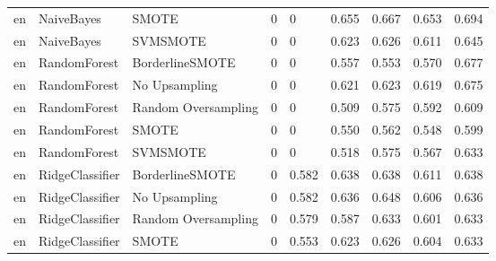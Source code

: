 \begin{tabular}{lllllllll}
      en &                   NaiveBayes &               SMOTE &         0 &                         0 &                 0.655 &                  0.667 &                                   0.653 &     0.694 \\
      en &                   NaiveBayes &            SVMSMOTE &         0 &                         0 &                 0.623 &                  0.626 &                                   0.611 &     0.645 \\
      en &                 RandomForest &     BorderlineSMOTE &         0 &                         0 &                 0.557 &                  0.553 &                                   0.570 &     0.677 \\
      en &                 RandomForest &       No Upsampling &         0 &                         0 &                 0.621 &                  0.623 &                                   0.619 &     0.675 \\
      en &                 RandomForest & Random Oversampling &         0 &                         0 &                 0.509 &                  0.575 &                                   0.592 &     0.609 \\
      en &                 RandomForest &               SMOTE &         0 &                         0 &                 0.550 &                  0.562 &                                   0.548 &     0.599 \\
      en &                 RandomForest &            SVMSMOTE &         0 &                         0 &                 0.518 &                  0.575 &                                   0.567 &     0.633 \\
      en &              RidgeClassifier &     BorderlineSMOTE &         0 &                     0.582 &                 0.638 &                  0.638 &                                   0.611 &     0.638 \\
      en &              RidgeClassifier &       No Upsampling &         0 &                     0.582 &                 0.636 &                  0.648 &                                   0.606 &     0.636 \\
      en &              RidgeClassifier & Random Oversampling &         0 &                     0.579 &                 0.587 &                  0.633 &                                   0.601 &     0.633 \\
      en &              RidgeClassifier &               SMOTE &         0 &                     0.553 &                 0.623 &                  0.626 &                                   0.604 &     0.633 \\

\end{tabular}
